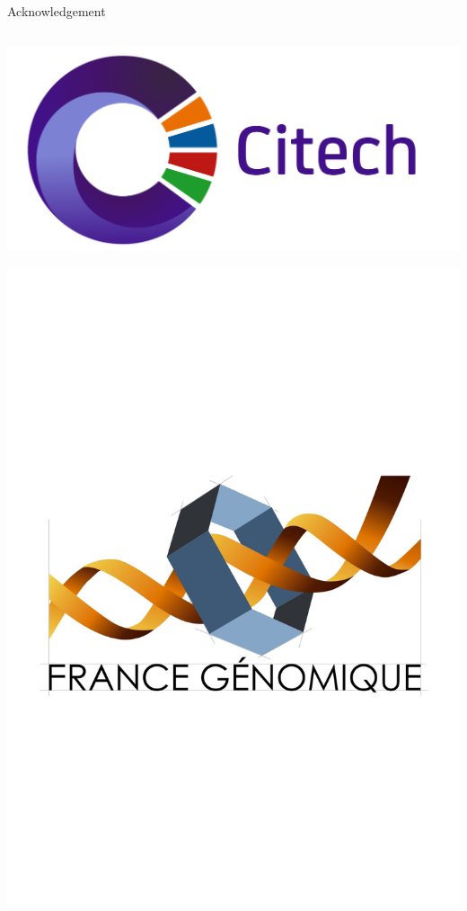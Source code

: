 \documentclass{beamer}
\begin{document}
\begin{frame}{Acknowledgement}
\begin{columns}[t]
\begin{column}{0.5\textwidth}
\begin{itemize}
                    \includegraphics[scale=0.07]{images/citech}

                    \includegraphics[scale=0.18,trim=0 8cm 0 9cm,clip]{images/france_genomique}
            \end{itemize}
        \end{column}
    \end{columns}
\end{frame}
\end{document}
